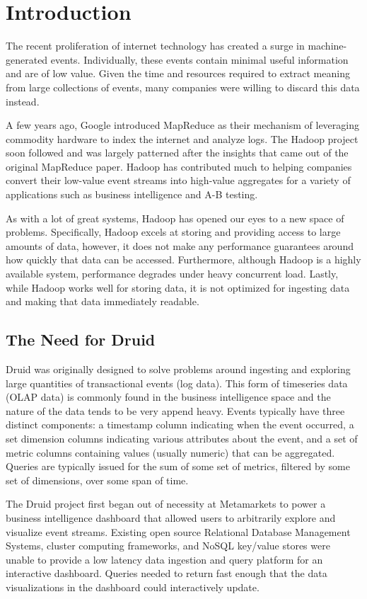 \documentclass{vldb}
\begin{document}
\section{Introduction}
The recent proliferation of internet technology has created a surge
in machine-generated events.  Individually, these events contain minimal useful
information and are of low value.  Given the time and resources required to
extract meaning from large collections of events, many companies were willing
to discard this data instead.  

A few years ago, Google introduced MapReduce as their mechanism of leveraging
commodity hardware to index the internet and analyze logs.  The Hadoop project
soon followed and was largely patterned after the insights that came out of the
original MapReduce paper. Hadoop has contributed much to helping companies
convert their low-value event streams into high-value aggregates for a variety
of applications such as business intelligence and A-B testing.

As with a lot of great systems, Hadoop has opened our eyes to a new space of
problems.  Specifically, Hadoop excels at storing and providing access to large
amounts of data, however, it does not make any performance guarantees around
how quickly that data can be accessed.  Furthermore, although Hadoop is a
highly available system, performance degrades under heavy concurrent load.
Lastly, while Hadoop works well for storing data, it is not optimized for
ingesting data and making that data immediately readable.

\subsection{The Need for Druid}
Druid was originally designed to solve problems around ingesting and exploring
large quantities of transactional events (log data). This form of timeseries
data (OLAP data) is commonly found in the business intelligence
space and the nature of the data tends to be very append heavy. Events typically
have three distinct components: a timestamp column indicating when the event
occurred, a set dimension columns indicating various attributes about the
event, and a set of metric columns containing values (usually numeric) that can
be aggregated. Queries are typically issued for the sum of some set of metrics,
filtered by some set of dimensions, over some span of time. 

The Druid project first began out of necessity at Metamarkets to power a
business intelligence dashboard that allowed users to arbitrarily explore and
visualize event streams. Existing open source Relational Database Management
Systems, cluster computing frameworks, and NoSQL key/value stores were unable
to provide a low latency data ingestion and query platform for an interactive
dashboard. Queries needed to return fast enough that the data visualizations in
the dashboard could interactively update.
\end{document}
